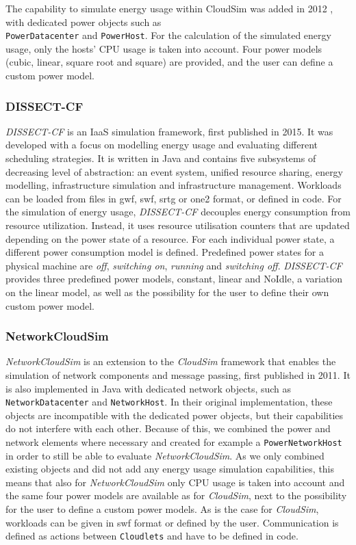 The capability to simulate energy usage within CloudSim was added in 2012 \cite{cloudsimPower_beloglazov_optimal_2012}, with dedicated power objects such as \\ \verb|PowerDatacenter| and \verb|PowerHost|. For the calculation of the simulated energy usage, only the hosts' CPU usage is taken into account. Four power models (cubic, linear, square root and square) are provided, and the user can define a custom power model.

\subsubsection{DISSECT-CF}
\textit{DISSECT-CF} \cite{kecskemeti_dissect-cf_2015} is an IaaS simulation framework, first published in 2015. It was developed with a focus on modelling energy usage and evaluating different scheduling strategies. It is written in Java and contains five subsystems of decreasing level of abstraction: an event system, unified resource sharing, energy modelling, infrastructure simulation and infrastructure management. Workloads can be loaded from files in gwf, swf, srtg or one2 format, or defined in code. For the simulation of energy usage, \textit{DISSECT-CF} decouples energy consumption from resource utilization. Instead, it uses resource utilisation counters that are updated depending on the power state of a resource. For each individual power state, a different power consumption model is defined. Predefined power states for a physical machine are \textit{off}, \textit{switching on}, \textit{running} and \textit{switching off}. \textit{DISSECT-CF} provides three predefined power models, constant, linear and NoIdle, a variation on the linear model, as well as the possibility for the user to define their own custom power model.

\subsubsection{NetworkCloudSim}
\textit{NetworkCloudSim} \cite{garg_networkcloudsim_2011} is an extension to the \textit{CloudSim} framework that enables the simulation of network components and message passing, first published in 2011. It is also implemented in Java with dedicated network objects, such as \verb|NetworkDatacenter| and \verb|NetworkHost|. In their original implementation, these objects are incompatible with the dedicated power objects, but their capabilities do not interfere with each other. Because of this, we combined the power and network elements where necessary and created for example a \verb|PowerNetworkHost| in order to still be able to evaluate \textit{NetworkCloudSim}. As we only combined existing objects and did not add any energy usage simulation capabilities, this means that also for \textit{NetworkCloudSim} only CPU usage is taken into account and the same four power models are available as for \textit{CloudSim}, next to the possibility for the user to define a custom power models. As is the case for \textit{CloudSim}, workloads can be given in swf format or defined by the user. Communication is defined as actions between \verb|Cloudlets| and have to be defined in code.

